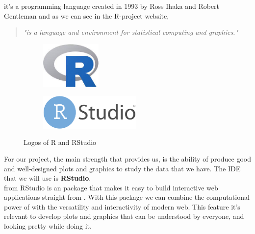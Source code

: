 \textbf{\R}  it's a programming language created in 1993 by Ross Ihaka and Robert Gentleman and as we can see in the \cite{R-project website} R-project website,
\begin{quote}
    \textit{"\R is a language and environment for statistical computing and graphics."} 
\end{quote} 

\begin{figure}
\centering
\begin{subfigure}{.5\textwidth}
  \centering
  \includegraphics[width=3cm]{images/R.jpg}
  \label{fig:sub1}
\end{subfigure}%
\begin{subfigure}{.5\textwidth}
  \centering
  \includegraphics[width=5cm]{images/Rstudio.png}
  \label{fig:sub2}
\end{subfigure}
\caption{Logos of R and RStudio}
\label{fig:test}
\end{figure}


For our project, the main strength that \R provides us, is the
ability of produce good and well-designed plots and graphics to study the data that we have. The \ac{IDE} that we will use is \textbf{RStudio}.\\

\textbf{\Shiny} from RStudio is \cite{shiny} an \R package that makes it easy to build interactive web applications straight from \R. 
With this package we can combine the computational power of \R with the versatility and interactivity of modern web. This feature it's relevant to develop plots and graphics that can be understood by everyone, and looking pretty while doing it.